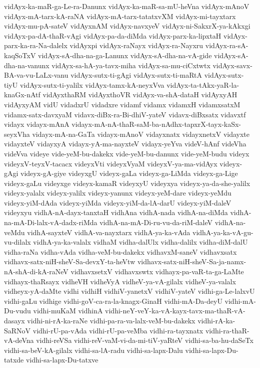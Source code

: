 {vidAyx-ka-maR-ga-Le-ra-Danunx
vidAyx-ka-maR-sa-mU-heVna
vidAyx-mAnoV
vidAyx-mA-tarx-kA-raNA
vidAyx-mA-tarx-tatatxvXM
vidAyx-mi-tayxtarx
vidAyx-mu-pA-sateV
vidAyxnAM
vidAyx-navxyeV
vidAyx-ni-SakxrX-ya-kAkxgi
vidAyx-pa-dA-thaR-vAgi
vidAyx-pa-da-diMda
vidAyx-parx-ka-lipxtaH
vidAyx-parx-ka-ra-Na-dalelx
vidAyxpi
vidAyx-raNayx
vidAyx-ra-Nayxru
vidAyx-ra-sA-kaqSoTxV
vidAyx-sA-dha-na-ga-Lanunx
vidAyx-sA-dha-na-vA-gide
vidAyx-sA-dha-na-vanunx
vidAyx-sa-hA-ya-tavx-miha
vidAyx-sa-mu-ciCxtwtx
vidAyx-savx-BA-va-vu-LaLx-vanu
vidAyx-sutx-ti-gAgi
vidAyx-sutx-ti-maRtA
vidAyx-sutx-tiyU
vidAyx-sutx-ti-yalilx
vidAyx-tamx-kA-neyxVva
vidAyx-ta-tAkx-yaR-la-knaGx-nAtf
vidAyxthaRM
vidAyxthoVR
vidAyx-va-shA-dataH
vidAyxyAH
vidAyxyAM
vidU
vidadxrU
vidadxre
vidamf
vidamx
vidamxH
vidamxsatxM
vidamx-satx-davxyaM
vidavx-diBx-ra-Bi-dhiV-yateV
vidavx-diBxsatx
vidavxtf
vidayx
vidayx-mAnA
vidayx-mA-nA-thaR-saM-ba-nAdhx-tapxrX-tayx-kaSx-seyxVha
vidayx-mA-na-GaTa
vidayx-mAnoV
vidayxnatx
vidayxnetxV
vidayxte
vidayxteV
vidayxyA
vidayx-yA-ma-nayxteV
vidayx-yeYva
videV-hAnf
videVha
videVva
videye
vide-yeM-bu-dakekx
vide-yeM-bu-danunx
vide-yeM-budu
videyx
videyxV-teyxV-tacacx
videyxVti
videyxVyaM
videyxV-ya-ma-vidAyx
videyx-gAgi
videyx-gA-giye
videyxgU
videyx-gaLa
videyx-ga-LiMda
videyx-ga-Lige
videyx-gaLu
videyxge
videyx-kamaR
videyxyU
videyxya
videyx-ya-da-she-yalilx
videyx-yalalx
videyx-yalilx
videyx-yanunx
videyx-yeM-dare
videyx-yeMdu
videyx-yiM-dAda
videyx-yiMda
videyx-yiM-da-lA-darU
videyx-yiM-daleV
videyxyu
vidhA-nA-dayx-tanxtaH
vidhAna
vidhA-nada
vidhA-na-diMda
vidhA-na-mA-Di-lalx-vA-dadx-riMda
vidhA-na-mA-Di-ru-vu-da-riM-daleV
vidhA-na-veMdu
vidhA-sayxteV
vidhA-va-nayxtarx
vidhA-ya-ka-vAda
vidhA-ya-ka-vA-gu-vu-dilalx
vidhA-ya-ka-valalx
vidhaM
vidha-dalUlx
vidha-dalilx
vidha-diM-dalU
vidha-raNa
vidha-vAda
vidha-veM-bu-dakekx
vidhavxM-saneV
vidhavxsatx
vidhavx-satx-niH-sheV-Sa-devxY-ta-heVtw
vidhavx-satx-niH-sheV-Sa-ja-namx-nA-shA-di-kA-raNeV
vidhavxsetxV
vidhavxswtx
vidhayx-pa-vaR-ta-ga-LaMte
vidhayx-thaRsayx
vidheVH
vidheVyA
vidheV-ya-vA-gilalx
vidheV-ya-valalx
vidheyx-yA-daMte
vidhi
vidhiH
vidhiV-yanetxV
vidhiV-yateV
vidhi-ga-Le-lalxvU
vidhi-gaLu
vidhige
vidhi-goV-ca-ra-la-knagx-GinaH
vidhi-mA-Da-deyU
vidhi-mA-Du-vudu
vidhi-muKaM
vidhinA
vidhi-neY-veY-ka-vA-kayx-tavx-ma-thaR-vA-dasayx
vidhi-ni-rA-ka-raNe
vidhi-pa-ra-va-lalx-veM-bu-dakekx
vidhi-rA-ka-SaRNoV
vidhi-rU-pa-vAda
vidhi-rU-pa-veMba
vidhi-ra-tayxnatx
vidhi-ra-thaR-vA-deVna
vidhi-reVSa
vidhi-reV-vaM-vi-da-mi-tiV-yaRteV
vidhi-sa-ba-hu-daSeTx
vidhi-sa-beV-kA-gilalx
vidhi-sa-lA-radu
vidhi-sa-lapx-Dalu
vidhi-sa-lapx-Du-tatxde
vidhi-sa-lapx-Du-tatxve
}
